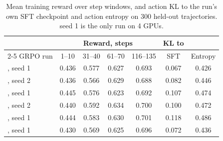 \begin{table}[t]
\centering\small
{\setlength{\tabcolsep}{3.5pt}%
\begin{tabular}{@{}lcccccc@{}}
\toprule
& \multicolumn{4}{c}{Reward, steps} & KL to & \\ \cmidrule(lr){2-5}
GRPO run & 1--10 & 31--40 & 61--70 & 116--135 & SFT & Entropy \\
\midrule
\armA{}, seed 1 & 0.436 & 0.577 & 0.627 & 0.693 & 0.067 & 0.426 \\
\armA{}, seed 2 & 0.436 & 0.566 & 0.629 & 0.688 & 0.082 & 0.446 \\
\armB{}, seed 1 & 0.445 & 0.576 & 0.623 & 0.692 & 0.107 & 0.474 \\
\armB{}, seed 2 & 0.440 & 0.592 & 0.634 & 0.700 & 0.100 & 0.472 \\
\armC{}, seed 1 & 0.444 & 0.583 & 0.630 & 0.701 & 0.118 & 0.486 \\
\armG{}, seed 1 & 0.430 & 0.569 & 0.625 & 0.696 & 0.072 & 0.436 \\
\bottomrule
\end{tabular}}
\caption{Mean training reward over step windows, and action KL to the run's own SFT checkpoint and action entropy on 300 held-out trajectories. \armA{} seed 1 is the only run on 4 GPUs.}
\label{tab:rldyn}
\end{table}
